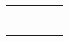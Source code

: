 \documentclass[12pt,a4paper]{article}
\begin{document}
\begin{landscape}
\begin{table}[ht!]
\begin{tabular}{|c|l|l|l|c|c|}
			                                                       &                           & \multirow{1}{*}{\gbbbb}             & &  &                                                                                                                                                        \\\cline{2-4}
			                                                       & \multirow{6}{*}{\dimii}   & \multirow{2}{*}{\gbbbbb}            & &  &                                                                                                                                                        \\\cline{4-4}
			                                                       &                           &                                     & &  &                                                                                                                                                        \\\cline{3-4}
			                                                       &                           & \multirow{1}{*}{\gbbbbbb}           & &  &                                                                                                                                                        \\\cline{3-4}
			                                                       &                           & \multirow{1}{*}{\gbbbbbbb}          & &  &                                                                                                                                                        \\\cline{3-4}
			                                                       &                           & \multirow{2}{*}{\gbbbbbbbb}         & &  &                                                                                                                                                        \\\cline{4-4}
			                                                       &                           &                                     & &  &                                                                                                                                                        \\\cline{2-4}
			                                                       & \multirow{7}{*}{\dimiii}  & \multirow{2}{*}{\gbbbbbbbbb}        & &  &                                                                                                                                                        \\\cline{4-4}

\end{tabular}
\end{table}
\end{landscape}
\end{document}
